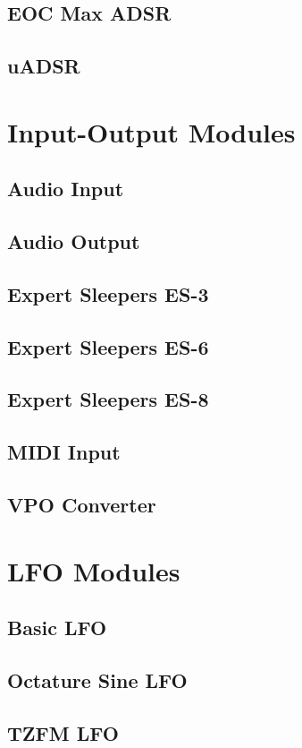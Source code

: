 \documentclass[11pt]{book}
\begin{document}
\section{EOC Max ADSR}
\section{uADSR}

\chapter{Input-Output Modules}
\section{Audio Input}
\section{Audio Output}
\section{Expert Sleepers ES-3}
\section{Expert Sleepers ES-6}
\section{Expert Sleepers ES-8}
\section{MIDI Input}
\section{VPO Converter}

\chapter{LFO Modules}
\section{Basic LFO}
\section{Octature Sine LFO}
\section{TZFM LFO}
\end{document}
